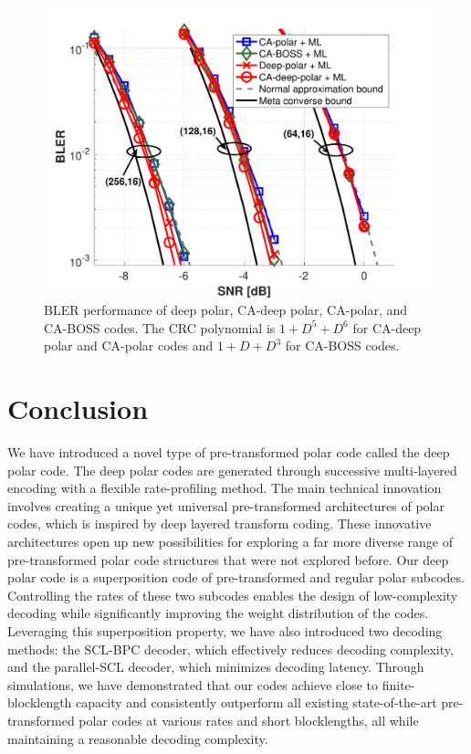 \documentclass[conference]{IEEEtran}
\begin{document}
\begin{figure}[t]
\centering
\includegraphics[width=1.1\columnwidth]{BLER_BOSS.pdf}
\caption{BLER performance of deep polar, CA-deep polar, CA-polar, and CA-BOSS codes. The CRC polynomial is $1 + D^5 + D^6$ for CA-deep polar and CA-polar codes and $1 + D + D^3$ for CA-BOSS codes.}
\label{fig:BLER-BOSS}
\end{figure}




\section{Conclusion}
 We have introduced a novel type of pre-transformed polar code called the deep polar code. The deep polar codes are generated through successive multi-layered encoding with a flexible rate-profiling method. The main technical innovation involves creating a unique yet universal pre-transformed architectures of polar codes, which is inspired by deep layered transform coding. These innovative architectures open up new possibilities for exploring a far more diverse range of pre-transformed polar code structures that were not explored before. Our deep polar code is a superposition code of pre-transformed and regular polar subcodes. Controlling the rates of these two subcodes enables the design of low-complexity decoding while significantly improving the weight distribution of the codes. Leveraging this superposition property, we have also introduced two decoding methods: the SCL-BPC decoder, which effectively reduces decoding complexity, and the parallel-SCL decoder, which minimizes decoding latency. Through simulations, we have demonstrated that our codes achieve close to finite-blocklength capacity and consistently outperform all existing state-of-the-art pre-transformed polar codes at various rates and short blocklengths, all while maintaining a reasonable decoding complexity.
\end{document}
